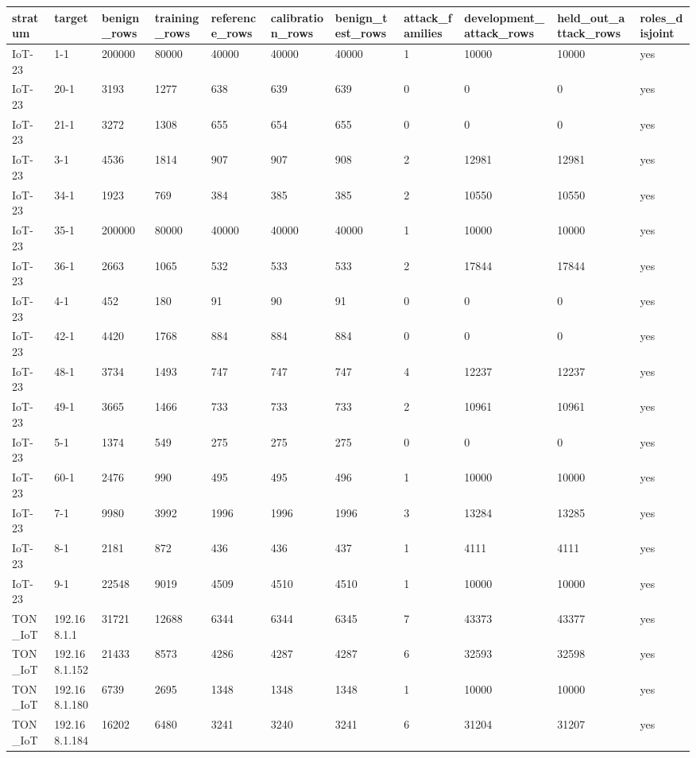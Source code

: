 \begin{tabular}{lllllllllll}
\toprule
stratum & target & benign\_rows & training\_rows & reference\_rows & calibration\_rows & benign\_test\_rows & attack\_families & development\_attack\_rows & held\_out\_attack\_rows & roles\_disjoint \\
\midrule
IoT-23 & 1-1 & 200000 & 80000 & 40000 & 40000 & 40000 & 1 & 10000 & 10000 & yes \\
IoT-23 & 20-1 & 3193 & 1277 & 638 & 639 & 639 & 0 & 0 & 0 & yes \\
IoT-23 & 21-1 & 3272 & 1308 & 655 & 654 & 655 & 0 & 0 & 0 & yes \\
IoT-23 & 3-1 & 4536 & 1814 & 907 & 907 & 908 & 2 & 12981 & 12981 & yes \\
IoT-23 & 34-1 & 1923 & 769 & 384 & 385 & 385 & 2 & 10550 & 10550 & yes \\
IoT-23 & 35-1 & 200000 & 80000 & 40000 & 40000 & 40000 & 1 & 10000 & 10000 & yes \\
IoT-23 & 36-1 & 2663 & 1065 & 532 & 533 & 533 & 2 & 17844 & 17844 & yes \\
IoT-23 & 4-1 & 452 & 180 & 91 & 90 & 91 & 0 & 0 & 0 & yes \\
IoT-23 & 42-1 & 4420 & 1768 & 884 & 884 & 884 & 0 & 0 & 0 & yes \\
IoT-23 & 48-1 & 3734 & 1493 & 747 & 747 & 747 & 4 & 12237 & 12237 & yes \\
IoT-23 & 49-1 & 3665 & 1466 & 733 & 733 & 733 & 2 & 10961 & 10961 & yes \\
IoT-23 & 5-1 & 1374 & 549 & 275 & 275 & 275 & 0 & 0 & 0 & yes \\
IoT-23 & 60-1 & 2476 & 990 & 495 & 495 & 496 & 1 & 10000 & 10000 & yes \\
IoT-23 & 7-1 & 9980 & 3992 & 1996 & 1996 & 1996 & 3 & 13284 & 13285 & yes \\
IoT-23 & 8-1 & 2181 & 872 & 436 & 436 & 437 & 1 & 4111 & 4111 & yes \\
IoT-23 & 9-1 & 22548 & 9019 & 4509 & 4510 & 4510 & 1 & 10000 & 10000 & yes \\
TON\_IoT & 192.168.1.1 & 31721 & 12688 & 6344 & 6344 & 6345 & 7 & 43373 & 43377 & yes \\
TON\_IoT & 192.168.1.152 & 21433 & 8573 & 4286 & 4287 & 4287 & 6 & 32593 & 32598 & yes \\
TON\_IoT & 192.168.1.180 & 6739 & 2695 & 1348 & 1348 & 1348 & 1 & 10000 & 10000 & yes \\
TON\_IoT & 192.168.1.184 & 16202 & 6480 & 3241 & 3240 & 3241 & 6 & 31204 & 31207 & yes \\

\end{tabular}
